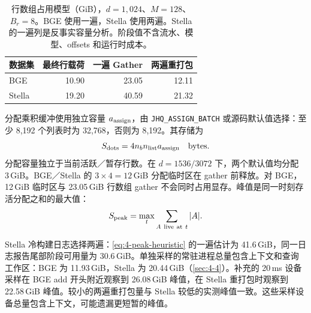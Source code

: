 \begin{table}[!htbp]
\centering
\caption[各构建阶段的行数组占用模型]{行数组占用模型（GiB），$d=1{,}024$、$M=128$、$B_r=8$。BGE 使用一遍，Stella 使用两遍。Stella 的一遍列是反事实容量分析。阶段值不含流水、模型、offsets 和运行时成本。}
\label{tab:4-phase-storage}
\small
\begin{tabular}{@{}lrrr@{}}
\toprule
数据集 & 最终行载荷 & 一遍 Gather & 两遍重打包 \\
\midrule
BGE & 10.90 & 23.05 & 12.11 \\
Stella & 19.20 & 40.59 & 21.32 \\
\bottomrule
\end{tabular}
\end{table}

分配乘积缓冲使用独立容量 $a_{\rm assign}$，由 \texttt{JHQ\_ASSIGN\_BATCH} 或源码默认值选择：至少 8,192 个列表时为 32,768，否则为 8,192。其存储为
\begin{equation}
 S_{\rm dots}=4n_b n_{\rm list}a_{\rm assign}\quad\text{bytes}.
 \label{eq:4-assignment-scratch}
\end{equation}
分配容量独立于当前活跃／暂存行数。在 $d=1536/3072$ 下，两个默认值均分配 3\,GiB。BGE／Stella 的 $3\times4=12$\,GiB 分配临时区在 gather 前释放。对 BGE，12\,GiB 临时区与 23.05\,GiB 行数组 gather 不会同时占用显存。峰值是同一时刻存活分配之和的最大值：
\[
 S_{\rm peak}=\max_t\sum_{A\ {\rm live\ at}\ t}|A|.
\]



Stella 冷构建日志选择两遍：\cref{eq:4-peak-heuristic} 的一遍估计为 41.6\,GiB，同一日志报告尾部阶段可用量为 30.6\,GiB。单独采样的常驻进程总量包含上下文和查询工作区：BGE 为 11.93\,GiB，Stella 为 20.44\,GiB（\cref{sec:4-4}）。补充的 20\,ms 设备采样在 BGE add 开头附近观察到 26.08\,GiB 峰值，在 Stella 重打包时观察到 22.58\,GiB 峰值。较小的两遍重打包量与 Stella 较低的实测峰值一致。这些采样设备总量包含上下文，可能遗漏更短暂的峰值。
